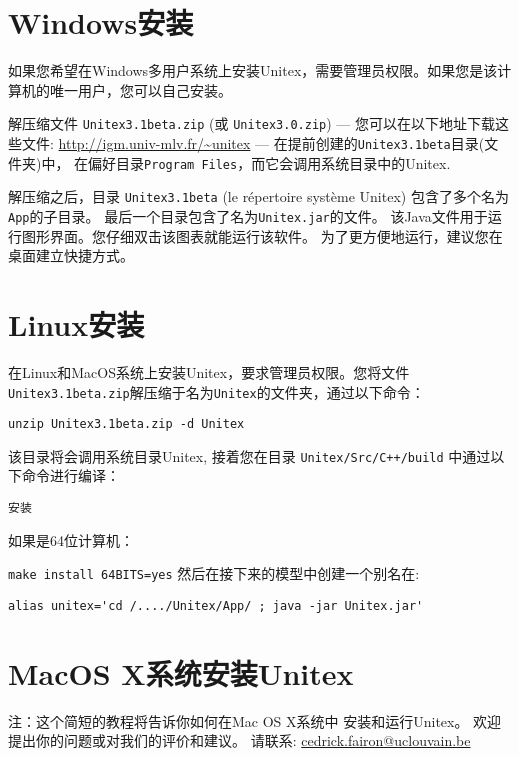 \section{Windows安装}
    如果您希望在Windows多用户系统上安装Unitex，需要管理员权限。如果您是该计算机的唯一用户，您可以自己安装。

\bigskip
\noindent 解压缩文件  \verb+Unitex3.1beta.zip+ (或 \verb+Unitex3.0.zip+)
--- 您可以在以下地址下载这些文件: \url{http://igm.univ-mlv.fr/~unitex} ---
在提前创建的\verb+Unitex3.1beta+目录(文件夹)中，
在偏好目录\verb+Program Files+，而它会调用系统目录中的Unitex.

\bigskip
\noindent 解压缩之后，目录 \verb+Unitex3.1beta+
(le répertoire système Unitex) 包含了多个名为\verb+App+的子目录。 最后一个目录包含了名为\verb+Unitex.jar+的文件。
 该Java文件用于运行图形界面。您仔细双击该图表就能运行该软件。
为了更方便地运行，建议您在桌面建立快捷方式。

\section{Linux安装}
在Linux和MacOS系统上安装Unitex，要求管理员权限。您将文件\verb+Unitex3.1beta.zip+解压缩于名为\verb+Unitex+的文件夹，通过以下命令：


\bigskip \noindent \verb$unzip Unitex3.1beta.zip -d Unitex$

\bigskip
\noindent 该目录将会调用系统目录Unitex,
接着您在目录 \verb|Unitex/Src/C++/build| 中通过以下命令进行编译：


\bigskip \verb+安装+

\bigskip
\noindent 如果是64位计算机：
 
\bigskip \verb+make install 64BITS=yes+
\bigskip
\noindent 然后在接下来的模型中创建一个别名在:

\bigskip \verb$alias unitex='cd /..../Unitex/App/ ; java -jar Unitex.jar'$


\section{MacOS X系统安装Unitex}
\label{section-macos-install}
\noindent 注：这个简短的教程将告诉你如何在Mac OS X系统中 安装和运行Unitex。
欢迎提出你的问题或对我们的评价和建议。
\noindent 请联系: \url{cedrick.fairon@uclouvain.be}


